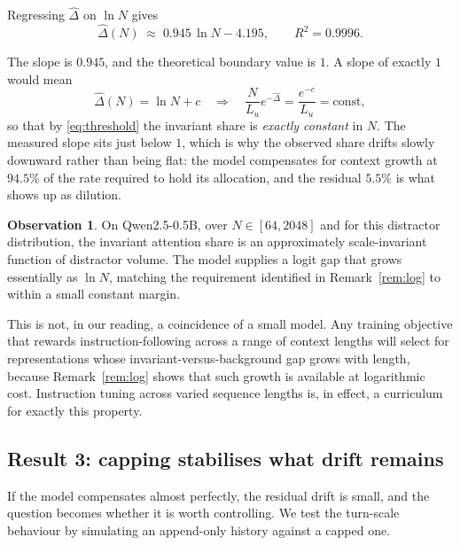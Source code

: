 \documentclass[11pt,a4paper]{article}
\theoremstyle{plain}
\theoremstyle{definition}
\newtheorem{observation}{Observation}
\theoremstyle{remark}
\begin{document}
Regressing $\hat{\Delta}$ on $\ln N$ gives
\begin{equation}
  \hat{\Delta}(N) \;\approx\; 0.945\,\ln N - 4.195,
  \qquad R^2 = 0.9996 .
  \label{eq:fit}
\end{equation}

The slope is $0.945$, and the theoretical boundary value is $1$. A slope of
exactly $1$ would mean
\begin{equation}
  \hat{\Delta}(N) = \ln N + c
  \quad\Longrightarrow\quad
  \frac{N}{L_u}e^{-\hat{\Delta}} = \frac{e^{-c}}{L_u} = \text{const},
\end{equation}
so that by \eqref{eq:threshold} the invariant share is \emph{exactly
constant} in $N$. The measured slope sits just below $1$, which is why the
observed share drifts slowly downward rather than being flat: the model
compensates for context growth at $94.5\%$ of the rate required to hold its
allocation, and the residual $5.5\%$ is what shows up as dilution.

\begin{observation}
\label{obs:compensation}
On Qwen2.5-0.5B, over $N \in [64, 2048]$ and for this distractor distribution,
the invariant attention share is an approximately scale-invariant function of
distractor volume. The model supplies a logit gap that grows essentially as
$\ln N$, matching the requirement identified in Remark~\ref{rem:log} to within
a small constant margin.
\end{observation}

This is not, in our reading, a coincidence of a small model. Any training
objective that rewards instruction-following across a range of context lengths
will select for representations whose invariant-versus-background gap grows with
length, because Remark~\ref{rem:log} shows that such growth is available at
logarithmic cost. Instruction tuning across varied sequence lengths is, in
effect, a curriculum for exactly this property.

\subsection{Result 3: capping stabilises what drift remains}

If the model compensates almost perfectly, the residual drift is small, and the
question becomes whether it is worth controlling. We test the turn-scale
behaviour by simulating an append-only history against a capped one.
\end{document}
